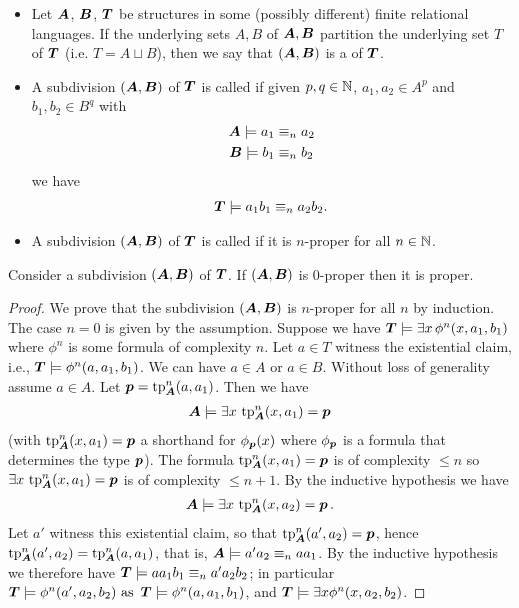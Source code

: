 \begin{Definition}
  \begin{itemize}
  \item Let $\AT$, $\BT$, $\TTB$ be structures in some (possibly different) finite relational languages. If the underlying sets $A, B$ of $\AT, \BT$ partition the underlying set $T$ of $\TTB$ (i.e. $T = A \sqcup B$), then we say that $(\AT, \BT)$ is a  of $\TTB$.
  \item A subdivision $(\AT, \BT)$ of $\TTB$ is called  if given $p,q \in \N$,  $a_1, a_2 \in A^p$ and $b_1, b_2 \in B^q$ with
    \begin{align*}
      \AT \models a_1 &\equiv_n a_2 \\
      \BT \models b_1 &\equiv_n b_2
    \end{align*}
    we have
    \begin{align*}
      \TTB \models a_1b_1 \equiv_n a_2b_2.
    \end{align*}
  \item A subdivision $(\AT, \BT)$ of $\TTB$ is called  if it is $n$-proper for all $n \in \N$.
  \end{itemize}
\end{Definition}

\begin{Lemma} \label{lm_subdivision}
  Consider a subdivision $(\AT, \BT)$ of $\TTB$. If $(\AT, \BT)$ is $0$-proper then it is proper.
\end{Lemma}

\begin{proof}
  We prove that the subdivision $(\AT, \BT)$ is $n$-proper for all $n$ by induction.
  The case $n = 0$ is given by the assumption.
  Suppose we have $\TTB \models \exists x \, \phi^n(x, a_1, b_1)$ where $\phi^n$ is some formula of complexity $n$. Let $a \in T$ witness the existential claim, i.e., $\TTB \models \phi^n(a, a_1, b_1)$. We can have $a \in A$ or $a \in B$. Without loss of generality assume $a \in A$. Let $\pp = \tp^n_{\AT} (a, a_1)$. Then we have 
  \begin{align*}
    \AT \models \exists x \, \tp^n_{\AT}(x, a_1) = \pp
  \end{align*}
  (with $\tp^n_{\AT}(x, a_1) = \pp$ a shorthand for $\phi_{\pp}(x)$ where $\phi_{\pp}$ is a formula that determines the type $\pp$).
  The formula $\tp^n_{\AT}(x, a_1) = \pp$ is of complexity $\leq n$ so $\exists x \, \tp^n_{\AT}(x, a_1) = \pp$ is of complexity $\leq n+1$. By the inductive hypothesis we have
  \begin{align*}
    \AT \models \exists x \, \tp^n_{\AT}(x, a_2) = \pp.
  \end{align*}
  Let $a'$ witness this existential claim, so that $\tp^n_{\AT}(a', a_2) = \pp$, hence $\tp^n_{\AT}(a', a_2) = \tp^n_{\AT}(a, a_1)$, that is,
  $\AT \models a'a_2 \equiv_n aa_1$. By the inductive hypothesis we therefore have
  $\TTB \models aa_1b_1 \equiv_n a'a_2b_2$; in particular $\TTB \models \phi^n(a', a_2, b_2)  \text { as } \TTB \models \phi^n(a, a_1, b_1)$,
  and $\TTB \models \exists x \phi^n(x, a_2, b_2)$.
\end{proof}

